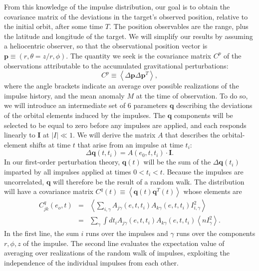 \documentclass[linenumbers, onecolumn]{aastex631}
\newcommand{\vecI}{\mathbf{I}}
\newcommand{\vecp}{\mathbf{p}}
\newcommand{\vecq}{\mathbf{q}}
\newcommand{\matA}{A}
\newcommand{\covm}{C}
\begin{document}
From this knowledge of the impulse distribution, our goal is to obtain the covariance matrix of the deviations in the target's observed position, relative to the initial orbit, after some time $T.$ The position observables are the range, plus the latitude and longitude of the target.  We will simplify our results by assuming a heliocentric observer, so that the observational position vector is $\vecp\equiv (r,\theta=z/r,\phi).$ The quantity we seek is the covariance matrix $\covm^p$ of the observations attributable to the accumulated gravitational perturbations:
\begin{equation}
  \covm^p  \equiv  \left\langle  \Delta\vecp \Delta\vecp^T\right\rangle,  \label{eq:Cp}
\end{equation}
where the angle brackets indicate an average over possible realizations of the impulse history, and the mean anomaly $M$ at the time of observation.  To do so, we will introduce an intermediate set of 6 parameters $\vecq$ describing the deviations of the orbital elements induced by the impulses.  The $\vecq$ components will be selected to be equal to zero before any impulses are applied, and each responds linearly to $\vecI$ at $|I|\ll 1.$
We will derive the matrix $\matA$ that describes the orbital-element shifts at time $t$ that arise from an impulse at time $t_i$: 
\begin{equation}
  \Delta \vecq(t,t_i) = \matA(e_0, t, t_i) \cdot \vecI.
  \label{eq:A}
\end{equation}
In our first-order perturbation theory, $\vecq(t)$ will be the sum of the $\Delta\vecq(t_i)$ imparted by all impulses applied at times $0<t_i<t.$  Because the impulses are uncorrelated, $\vecq$ will therefore be the result of a random walk.  The distribution will have a covariance matrix $\covm^q(t) \equiv \left\langle \vecq(t) \vecq^T(t) \right\rangle$ whose elements are
\begin{eqnarray}
  \covm^q_{jk}(e_o,t) & = & \left\langle \sum_{i,\gamma} \matA_{j\gamma}(e,t,t_i) \matA_{k\gamma}(e,t,t_i) I^2_{i,\gamma} \right\rangle \\
           & = & \sum_\gamma \int dt_i \matA_{j\gamma}(e,t,t_i) \matA_{k\gamma}(e,t,t_i) \left\langle n I_\gamma^2\right\rangle.
\label{eq:Cqjk}
\end{eqnarray}
In the first line, the sum $i$ runs over the impulses and $\gamma$ runs over the components $r,\phi,z$ of the impulse. The second line evaluates the expectation value of averaging over realizations of the random walk of impulses, exploiting the independence of the individual impulses from each other.
\end{document}
